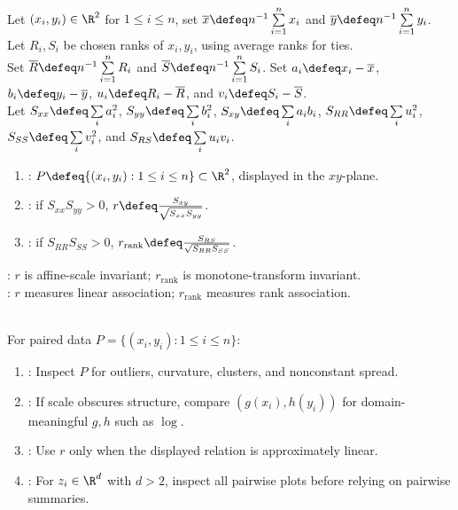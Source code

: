 \begin{definition} \label{def:scatterplot-and-correlation-summaries} \\
Let $(x_i,y_i)\in\R^2$ for $1\leq i\leq n$, set $\overline{x}\defeq n^{-1}\sum\limits_{i=1}^n x_i$ and $\overline{y}\defeq n^{-1}\sum\limits_{i=1}^n y_i$.\\
Let $R_i,S_i$ be chosen ranks of $x_i,y_i$, using average ranks for ties.\\
Set $\overline{R}\defeq n^{-1}\sum\limits_{i=1}^nR_i$ and $\overline{S}\defeq n^{-1}\sum\limits_{i=1}^nS_i$. Set $a_i\defeq x_i-\overline{x}$, $b_i\defeq y_i-\overline{y}$, $u_i\defeq R_i-\overline{R}$, and $v_i\defeq S_i-\overline{S}$.\\
Let $S_{xx}\defeq\sum\limits_i a_i^2$, $S_{yy}\defeq\sum\limits_i b_i^2$, $S_{xy}\defeq\sum\limits_i a_ib_i$, $S_{RR}\defeq\sum\limits_i u_i^2$, $S_{SS}\defeq\sum\limits_i v_i^2$, and $S_{RS}\defeq\sum\limits_i u_iv_i$.
\begin{enumerate}[label=(\roman*)]
\setlength{\itemsep}{0pt}
\item {}: $P\defeq\{(x_i,y_i):1\leq i\leq n\}\subset\R^2$, displayed in the $xy$-plane.
\item {}: if $S_{xx}S_{yy}>0$, $r\defeq \frac{S_{xy}}{\sqrt{S_{xx}S_{yy}}}$.
\item {}: if $S_{RR}S_{SS}>0$, $r_{\mathrm{rank}}\defeq \frac{S_{RS}}{\sqrt{S_{RR}S_{SS}}}$.
\end{enumerate}
: $r$ is affine-scale invariant; $r_{\mathrm{rank}}$ is monotone-transform invariant.\\
: $r$ measures linear association; $r_{\mathrm{rank}}$ measures rank association.
\end{definition}

\begin{method} \label{meth:scatterplot-diagnostic-workflow} \\
For paired data $P=\{(x_i,y_i):1\leq i\leq n\}$:
\begin{enumerate}[label=(\roman*)]
\setlength{\itemsep}{0pt}
\item {}: Inspect $P$ for outliers, curvature, clusters, and nonconstant spread.
\item {}: If scale obscures structure, compare $(g(x_i),h(y_i))$ for domain-meaningful $g,h$ such as $\log$.
\item {}: Use $r$ only when the displayed relation is approximately linear.
\item {}: For $z_i\in\R^d$ with $d>2$, inspect all pairwise plots before relying on pairwise summaries.
\end{enumerate}
\end{method}

